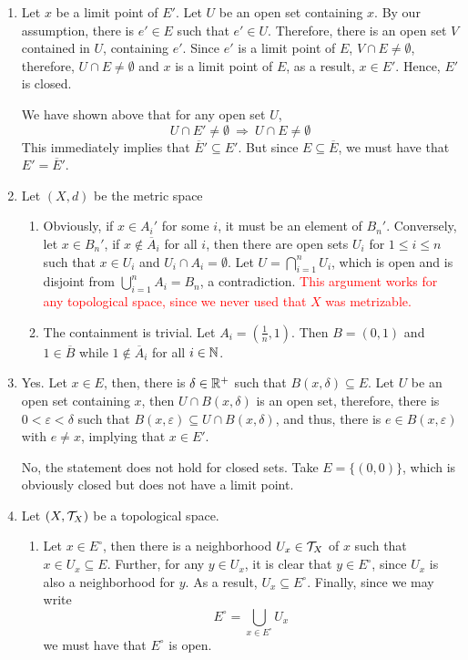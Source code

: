 \begin{enumerate}
\item Let $x$ be a limit point of $E'$. Let $U$ be an open set containing $x$. By our assumption, there is $e'\in E$ such that $e'\in U$. Therefore, there is an open set $V$ contained in $U$, containing $e'$. Since $e'$ is a limit point of $E$, $V\cap E\ne\emptyset$, therefore, $U\cap E\ne\emptyset$ and $x$ is a limit point of $E$, as a result, $x\in E'$. Hence, $E'$ is closed.

We have shown above that for any open set $U$, 
\begin{equation*}
    U\cap E'\ne\emptyset~\Longrightarrow~U\cap E\ne\emptyset
\end{equation*}
This immediately implies that $\overline{E}'\subseteq E'$. But since $E\subseteq\overline{E}$, we must have that $E' = \overline{E}'$.

\item Let $(X,d)$ be the metric space
\begin{enumerate}
    \item Obviously, if $x\in A_i'$ for some $i$, it must be an element of $B_n'$. Conversely, let $x\in B_n'$, if $x\notin\overline{A}_i$ for all $i$, then there are open sets $U_i$ for $1\le i\le n$ such that $x\in U_i$ and $U_i\cap A_i = \emptyset$. Let $U = \bigcap_{i = 1}^nU_i$, which is open and is disjoint from $\bigcup_{i = 1}^nA_i = B_n$, a contradiction. \textcolor{red}{This argument works for any topological space, since we never used that $X$ was metrizable.}

    \item The containment is trivial. Let $A_i = \left(\frac{1}{n}, 1\right)$. Then $B = (0,1)$ and $1\in\overline{B}$ while $1\notin\overline{A}_i$ for all $i\in\mathbb{N}$.
\end{enumerate}

\item Yes. Let $x\in E$, then, there is $\delta\in\mathbb{R}^+$ such that $B(x,\delta)\subseteq E$. Let $U$ be an open set containing $x$, then $U\cap B(x,\delta)$ is an open set, therefore, there is $0 < \varepsilon < \delta$ such that $B(x,\varepsilon)\subseteq U\cap B(x,\delta)$, and thus, there is $e\in B(x,\varepsilon)$ with $e\ne x$, implying that $x\in E'$.

No, the statement does not hold for closed sets. Take $E = \{(0,0)\}$, which is obviously closed but does not have a limit point.

\item Let $(X,\mathcal{T}_X)$ be a topological space.
\begin{enumerate}[label=(\alph*)]
    \item Let $x\in E^\circ$, then there is a neighborhood $U_x\in\mathcal{T}_X$ of $x$ such that $x\in U_x\subseteq E$. Further, for any $y\in U_x$, it is clear that $y\in E^\circ$, since $U_x$ is also a neighborhood for $y$. As a result, $U_x\subseteq E^\circ$. Finally, since we may write 
    \begin{equation*}
        E^\circ = \bigcup_{x\in E^\circ}U_x
    \end{equation*}
    we must have that $E^\circ$ is open.


\end{enumerate}
\end{enumerate}
